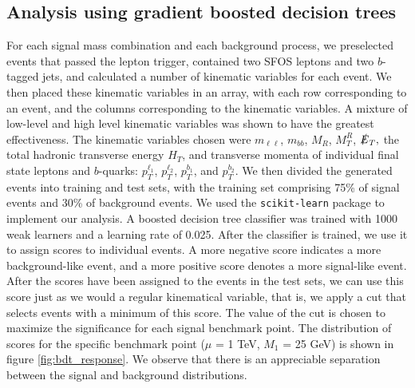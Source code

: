 \documentclass[a4paper,11pt]{article}
\begin{document}
\subsection{Analysis using gradient boosted decision trees}\label{subsec:bdt}

For each signal mass combination and each background process, we preselected
events that passed the lepton trigger, contained two SFOS leptons and two
$b$-tagged jets, and calculated a number of kinematic variables for each event. We then
placed these kinematic variables in an array, with each row corresponding to an event, and
the columns corresponding to the kinematic variables. A mixture of low-level and high level
kinematic variables was shown to have the greatest effectiveness. The kinematic variables chosen were
$m_{\ell\ell}$, $m_{bb}$, $M_R$, $M_T^R$, $\slashed{E}_T,$ the total hadronic
transverse energy $H_T$,   and transverse momenta of individual final state
leptons and $b$-quarks: $p_T^{\ell_1}$, $p_T^{\ell_2}$, $p_T^{b_1}$, and $p_T^{b_2}$. We
then divided the generated events into training and test sets, with the training set
comprising 75\% of signal events and 30\% of background events.  We used the
\texttt{scikit-learn} package  \citep{Pedregosa2011} to implement our analysis.
A boosted decision tree classifier was trained with 1000 weak learners and a
learning rate of 0.025.  
After the classifier is trained, we use it to assign
scores to individual events. A more negative score indicates a more
background-like event, and a more positive score denotes a more signal-like
event. After the scores have been assigned to the events in the test sets, we
can use this score just as we would a regular kinematical variable, that is, we
apply a cut that selects events with a minimum of this score. The value of the
cut is chosen to maximize the significance for each signal benchmark point. The
distribution of scores for the specific benchmark point ($\mu$ = 1 TeV, $M_1$
= 25 GeV) is shown in figure \ref{fig:bdt_response}. We observe that there is an
appreciable separation between the signal and background distributions.
\end{document}

